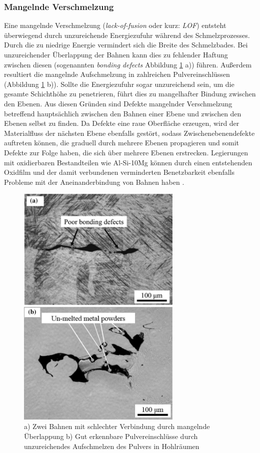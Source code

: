 		\subsubsection{Mangelnde Verschmelzung}
		Eine mangelnde Verschmelzung (\emph{lack-of-fusion} oder kurz: \emph{LOF}) entsteht
		überwiegend durch unzureichende Energiezufuhr während des Schmelzprozesses. Durch die zu
		niedrige Energie vermindert sich die Breite des Schmelzbades. Bei unzureichender
		Überlappung der Bahnen kann dies zu fehlender Haftung zwischen diesen (sogenannten
		\emph{bonding defects} Abbildung \ref{fig:defects_lof} a)) führen. Außerdem resultiert
		die mangelnde Aufschmelzung in zahlreichen Pulvereinschlüssen (Abbildung
		\ref{fig:defects_lof} b)). Sollte die Energiezufuhr sogar unzureichend sein, um die
		gesamte Schichthöhe zu penetrieren, führt dies zu mangelhafter Bindung zwischen den
		Ebenen. Aus diesen Gründen sind Defekte mangelnder Verschmelzung betreffend hauptsächlich
		zwischen den Bahnen einer Ebene und zwischen den Ebenen selbst zu finden. Da Defekte eine
		raue Oberfläche erzeugen, wird der Materialfluss der nächsten Ebene ebenfalls gestört,
		sodass Zwischenebenendefekte auftreten können, die graduell durch mehrere Ebenen
		propagieren und somit Defekte zur Folge haben, die sich über mehrere Ebenen erstrecken.
		Legierungen mit oxidierbaren Bestandteilen wie Al-Si-10Mg können durch einen entstehenden
		Oxidfilm und der damit verbundenen verminderten Benetzbarkeit ebenfalls Probleme mit der
		Aneinanderbindung von Bahnen haben \cite{zhang2017defect}.

		\begin{figure}[ht]
			\centering
			\includegraphics[width=0.7\textwidth]{chapter/main/img/defects/lack_of_fusion.png}
			\caption{a) Zwei Bahnen mit schlechter Verbindung durch mangelnde Überlappung
			b) Gut erkennbare Pulvereinschlüsse durch unzureichendes Aufschmelzen des Pulvers
			in Hohlräumen \cite{zhang2017defect}}
			\label{fig:defects_lof}
		\end{figure}

